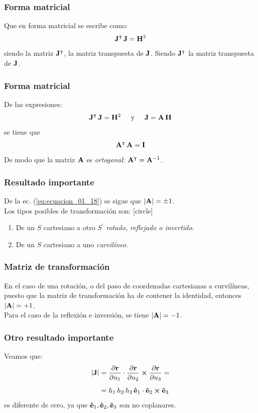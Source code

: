 \documentclass[12pt]{beamer}
\begin{document}
\begin{frame}
\frametitle{Forma matricial}
Que en forma matricial se escribe como:
\pause
\begin{align*}
\vb{J}^{\intercal} \, \vb{J} = \vb{H}^{2}
\end{align*}
siendo la matriz $\vb{J}^{\intercal}$, la matriz transpuesta de $\vb{J}$. Siendo $\vb{J}^{\intercal}$ la matriz transpuesta de $\vb{J}$.
\end{frame}
\begin{frame}
\frametitle{Forma matricial}
De las expresiones:
\pause
\begin{align*}
\vb{J}^{\intercal} \, \vb{J} = \vb{H}^{2} \hspace{0.5cm} \mbox{y} \hspace{0.5cm} \vb{J} = \vb{A} \, \vb{H}
\end{align*}
se tiene que
\begin{align}
\vb{A}^{\intercal} \, \vb{A} = \vb{I}
\label{eq:ecuacion_01_18}
\end{align}
\pause
De modo que la matriz $\vb{A}$ es \emph{ortogonal}: $\vb{A}^{\intercal} = \vb{A}^{-1}$.
\end{frame}
\begin{frame}
\frametitle{Resultado importante}
De la ec. (\ref{eq:ecuacion_01_18}) se sigue que $\abs{\vb{A}} = \pm 1$.
\\
\bigskip
\pause
Los tipos posibles de transformación son:
[circle]
\begin{enumerate}[<+->]
\item De un $S$ cartesiano a otro $S^{\prime}$ \emph{rotado, reflejado o invertido}.
\item De un $S$ cartesiano a uno \emph{curvilíneo}.
\end{enumerate}
\end{frame}
\begin{frame}
\frametitle{Matriz de transformación}
En el caso de una rotación, o del paso de coordenadas cartesianas a curvilíneas, puesto que la matriz de transformación ha de contener la identidad, entonces $\abs{\vb{A}} = +1$.
\\
\bigskip
\pause
Para el caso de la reflexión e inversión, se tiene $\abs{\vb{A}} = -1$.
\end{frame}
\begin{frame}
\frametitle{Otro resultado importante}
Veamos que:
\pause
\begin{align*}
\abs{\vb{J}} &= \pdv{\vb{r}}{u_{1}} \cdot \pdv{\vb{r}}{u_{2}} \cp \pdv{\vb{r}}{u_{3}} = \\[0.5em]
&= h_{1} \, h_{2} \, h_{3} \, \vu{e}_{1} \cdot \vu{e}_{2} \cp \vu{e}_{3}
\end{align*}
es diferente de cero, ya que $\vu{e}_{1}, \vu{e}_{2}, \vu{e}_{3}$ son no coplanares.
\end{frame}
\end{document}
